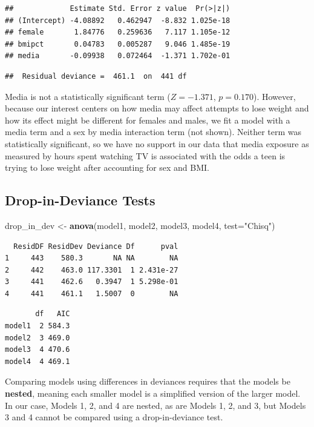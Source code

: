 \documentclass[
]{krantz}
\newenvironment{Shaded}{\begin{snugshade}}{\end{snugshade}}
\newcommand{\AttributeTok}[1]{\textcolor[rgb]{0.27,0.27,0.27}{#1}}
\newcommand{\FunctionTok}[1]{\textcolor[rgb]{0.27,0.27,0.27}{\textbf{#1}}}
\newcommand{\NormalTok}[1]{#1}
\newcommand{\OtherTok}[1]{\textcolor[rgb]{0.37,0.37,0.37}{#1}}
\newcommand{\StringTok}[1]{\textcolor[rgb]{0.5,0.5,0.5}{#1}}
\begin{document}
\begin{verbatim}
##             Estimate Std. Error z value  Pr(>|z|)
## (Intercept) -4.08892   0.462947  -8.832 1.025e-18
## female       1.84776   0.259636   7.117 1.105e-12
## bmipct       0.04783   0.005287   9.046 1.485e-19
## media       -0.09938   0.072464  -1.371 1.702e-01
\end{verbatim}

\begin{verbatim}
##  Residual deviance =  461.1  on  441 df
\end{verbatim}

Media is not a statistically significant term (\(Z=-1.371\), \(p=0.170\)). However, because our interest centers on how media may affect attempts to lose weight and how its effect might be different for females and males, we fit a model with a media term and a sex by media interaction term (not shown). Neither term was statistically significant, so we have no support in our data that media exposure as measured by hours spent watching TV is associated with the odds a teen is trying to lose weight after accounting for sex and BMI.

\subsection{Drop-in-Deviance Tests}\label{drop-in-deviance-tests}

\begin{Shaded}
\begin{Highlighting}[]
\NormalTok{drop\_in\_dev }\OtherTok{\textless{}{-}} \FunctionTok{anova}\NormalTok{(model1, model2, model3, model4,}
                     \AttributeTok{test=}\StringTok{"Chisq"}\NormalTok{)}
\end{Highlighting}
\end{Shaded}

\begin{verbatim}
  ResidDF ResidDev Deviance Df      pval
1     443    580.3       NA NA        NA
2     442    463.0 117.3301  1 2.431e-27
3     441    462.6   0.3947  1 5.298e-01
4     441    461.1   1.5007  0        NA
\end{verbatim}

\begin{verbatim}
       df   AIC
model1  2 584.3
model2  3 469.0
model3  4 470.6
model4  4 469.1
\end{verbatim}

Comparing models using differences in deviances requires that the models be \textbf{nested}, meaning each smaller model is a simplified version of the larger model. In our case, Models 1, 2, and 4 are nested, as are Models 1, 2, and 3, but Models 3 and 4 cannot be compared using a drop-in-deviance test.
\end{document}
